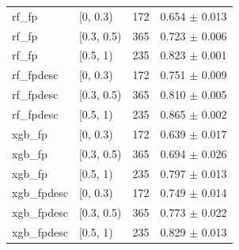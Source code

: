 \begin{table}[t]
\begin{tabular}{llcc}
rf\_fp & [0, 0.3) & 172 & 0.654 $\pm$ 0.013 \\
rf\_fp & [0.3, 0.5) & 365 & 0.723 $\pm$ 0.006 \\
rf\_fp & [0.5, 1) & 235 & 0.823 $\pm$ 0.001 \\
rf\_fpdesc & [0, 0.3) & 172 & 0.751 $\pm$ 0.009 \\
rf\_fpdesc & [0.3, 0.5) & 365 & 0.810 $\pm$ 0.005 \\
rf\_fpdesc & [0.5, 1) & 235 & 0.865 $\pm$ 0.002 \\
xgb\_fp & [0, 0.3) & 172 & 0.639 $\pm$ 0.017 \\
xgb\_fp & [0.3, 0.5) & 365 & 0.694 $\pm$ 0.026 \\
xgb\_fp & [0.5, 1) & 235 & 0.797 $\pm$ 0.013 \\
xgb\_fpdesc & [0, 0.3) & 172 & 0.749 $\pm$ 0.014 \\
xgb\_fpdesc & [0.3, 0.5) & 365 & 0.773 $\pm$ 0.022 \\
xgb\_fpdesc & [0.5, 1) & 235 & 0.829 $\pm$ 0.013 \\
\bottomrule
\end{tabular}
\end{table}

